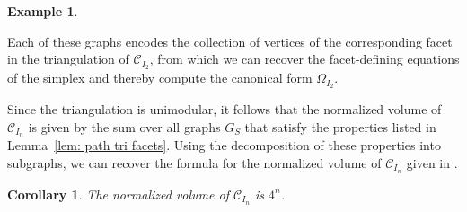 \documentclass[11pt]{article}
\newtheorem{coro}[theo]{Corollary}
\theoremstyle{definition}
\newtheorem{example}[theo]{Example}
\numberwithin{equation}{section}
\begin{document}
\begin{example}
\begin{center}
        \medskip
        
        \end{center}

        Each of these graphs encodes the collection of vertices of the corresponding facet in the triangulation of $\mathcal{C}_{I_{2}}$, from which we can recover the facet-defining equations of the simplex and thereby compute the canonical form $\Omega_{I_2}$. 
\end{example}

Since the triangulation is unimodular, it follows that the normalized volume of $\mathcal{C}_{I_{n}}$ is given by the sum over all graphs $G_S$ that satisfy the properties listed in Lemma~\ref{lem: path tri facets}. 
Using the decomposition of these properties into subgraphs, we can recover the formula for the normalized volume of $\mathcal{C}_{I_{n}}$ given in \cite{kuhne2022faces}. 

\begin{coro}
\label{cor: volume path}
The normalized volume of $\mathcal{C}_{I_{n}}$ is $4^n$.
\end{coro}
\end{document}
